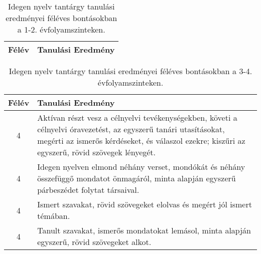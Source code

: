        
           \begin{longtable}{c | p{12cm} }
            \caption[Idegen nyelv 1-2.]{Idegen nyelv tantárgy tanulási eredményei féléves bontásokban a 1-2. évfolyamszinteken. }  \\

            \textbf{Félév} & \textbf{Tanulási Eredmény} \\
            \hline
            \endhead
                                
                                      
                                
                                      
                                
                                      
                                
                                      
                                
                                      
                        \end{longtable}
            \clearpage

       
           \begin{longtable}{c | p{12cm} }
            \caption[Idegen nyelv 3-4.]{Idegen nyelv tantárgy tanulási eredményei féléves bontásokban a 3-4. évfolyamszinteken. }  \\

            \textbf{Félév} & \textbf{Tanulási Eredmény} \\
            \hline
            \endhead
                                
                                      
                                
                                      
                                
                                      
                                
                                      
                                
                                          4 &  Aktívan részt vesz a célnyelvi tevékenységekben, követi a célnyelvi óravezetést, az egyszerű tanári utasításokat, megérti az ismerős kérdéseket, és válaszol ezekre; kiszűri az egyszerű, rövid szövegek lényegét. \\ \hline
                                          4 &  Idegen nyelven elmond néhány verset, mondókát és néhány összefüggő mondatot önmagáról, minta alapján egyszerű párbeszédet folytat társaival. \\ \hline
                                          4 &  Ismert szavakat, rövid szövegeket elolvas és megért jól ismert témában. \\ \hline
                                          4 &  Tanult szavakat, ismerős mondatokat lemásol, minta alapján egyszerű, rövid szövegeket alkot. \\ \hline
                                      
                        \end{longtable}
            \clearpage


